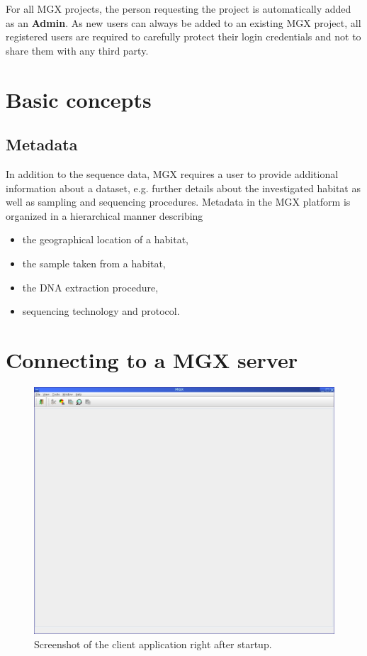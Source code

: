 For all MGX projects, the person requesting the project is automatically added as an \textbf{Admin}.
As new users can always be added to an existing MGX project, all registered users are required
to carefully protect their login credentials and not to share them with any third party.

\section{Basic concepts}
\subsection{Metadata}

In addition to the sequence data, MGX requires a user to provide additional information
about a dataset, e.g. further details about the investigated habitat as well as sampling
and sequencing procedures. Metadata in the MGX platform is organized in a hierarchical
manner describing

\begin{itemize}
  \item the geographical location of a habitat,
  \item the sample taken from a habitat,
  \item the DNA extraction procedure,
  \item sequencing technology and protocol.
\end{itemize}

\section{Connecting to a MGX server}

\begin{figure}[H]
\centering
\includegraphics[width=\textwidth]{img/mgx/startup}
\caption[MGX client]{Screenshot of the client application right after startup.}
\label{startup}
\end{figure}

